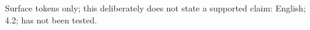Surface tokens only; this deliberately does not state a supported claim: English; 4.2; has not been tested.
